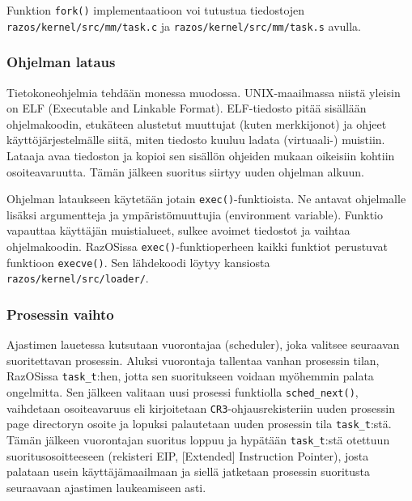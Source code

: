 \par

Funktion \texttt{fork()} implementaatioon voi tutustua tiedostojen \texttt{razos/kernel/src/mm/task.c} ja \texttt{razos/kernel/src/mm/task.s} avulla.

\subsubsection{Ohjelman lataus}

Tietokoneohjelmia tehdään monessa muodossa. UNIX-maailmassa niistä yleisin on ELF (Executable and Linkable Format). ELF-tiedosto pitää sisällään ohjelmakoodin, etukäteen alustetut muuttujat (kuten merkkijonot) ja ohjeet käyttöjärjestelmälle siitä, miten tiedosto kuuluu ladata (virtuaali-) muistiin. Lataaja avaa tiedoston ja kopioi sen sisällön ohjeiden mukaan oikeisiin kohtiin osoiteavaruutta. Tämän jälkeen suoritus siirtyy uuden ohjelman alkuun.

\par

Ohjelman lataukseen käytetään jotain \texttt{exec()}-funktioista. Ne antavat ohjelmalle lisäksi argumentteja ja ympäristömuuttujia (environment variable). Funktio vapauttaa käyttäjän muistialueet, sulkee avoimet tiedostot ja vaihtaa ohjelmakoodin. RazOSissa \texttt{exec()}-funktioperheen kaikki funktiot perustuvat funktioon \texttt{execve()}. Sen lähdekoodi löytyy kansiosta \texttt{razos/kernel/src/loader/}.

\subsubsection{Prosessin vaihto}

Ajastimen lauetessa kutsutaan vuorontajaa (scheduler), joka valitsee seuraavan suoritettavan prosessin. Aluksi vuorontaja tallentaa vanhan prosessin tilan, RazOSissa \texttt{task\_t}:hen, jotta sen suoritukseen voidaan myöhemmin palata ongelmitta. Sen jälkeen valitaan uusi prosessi funktiolla \texttt{sched\_next()}, vaihdetaan osoiteavaruus eli kirjoitetaan \texttt{CR3}-ohjausrekisteriin uuden prosessin page directoryn osoite ja lopuksi palautetaan uuden prosessin tila \texttt{task\_t}:stä. Tämän jälkeen vuorontajan suoritus loppuu ja hypätään \texttt{task\_t}:stä otettuun suoritusosoitteeseen (rekisteri EIP, [Extended] Instruction Pointer), josta palataan usein käyttäjämaailmaan ja siellä jatketaan prosessin suoritusta seuraavaan ajastimen laukeamiseen asti.

